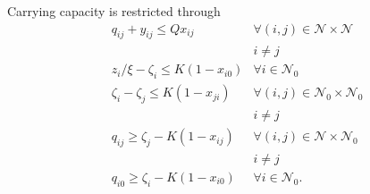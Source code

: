 \documentclass[journal]{IEEEtran}
\begin{document}
Carrying capacity is restricted through
\begin{subequations}
\label{eq:capacity-constraints}
\begin{align}
& {\ensuremath{q_{{i} {j}}}} + {\ensuremath{{\ensuremath{y}}_{{i} {j}}}} \leq {\ensuremath{Q}} {\ensuremath{x_{{i} {j}}}} & {\ensuremath{\forall({i},{j}) \in {\ensuremath{\mathcal{N}}} \times {\ensuremath{\mathcal{N}}}}} \label{eq:constrain-capacity} \\
& & i \neq j \nonumber \\
& {\ensuremath{z_{{i}}}}/{\ensuremath{\xi}} - {\ensuremath{\zeta_{{i}}}} \leq {\ensuremath{K}} \left( 1 - {\ensuremath{x_{{i} {0}}}} \right) & {\ensuremath{\forall {i} \in {\ensuremath{{\ensuremath{\mathcal{N}}}_{0}}}}} \label{eq:set-location-energy-to-route-energy} \\
& {\ensuremath{\zeta_{{i}}}} - {\ensuremath{\zeta_{{j}}}} \leq {\ensuremath{K}} \left( 1 - {\ensuremath{x_{{j} {i}}}} \right) & {\ensuremath{\forall({i},{j}) \in {\ensuremath{{\ensuremath{\mathcal{N}}}_{0}}} \times {\ensuremath{{\ensuremath{\mathcal{N}}}_{0}}}}} \label{eq:battery-capacity-at-location} \\
& & i \neq j \nonumber \\
& {\ensuremath{q_{{i} {j}}}} \geq {\ensuremath{\zeta_{{j}}}} - {\ensuremath{K}} \left( 1 - {\ensuremath{x_{{i} {j}}}} \right) & {\ensuremath{\forall({i},{j}) \in {\ensuremath{\mathcal{N}}} \times {\ensuremath{{\ensuremath{\mathcal{N}}}_{0}}}}} \label{eq:battery-weight-on-path} \\
& & i \neq j \nonumber \\
& {\ensuremath{q_{{i} {0}}}} \geq {\ensuremath{\zeta_{{i}}}} - {\ensuremath{K}} \left( 1 - {\ensuremath{x_{{i} {0}}}} \right) & {\ensuremath{\forall {i} \in {\ensuremath{{\ensuremath{\mathcal{N}}}_{0}}}}}. \label{eq:battery-weight-on-path-2}
\end{align} 
\end{subequations}
\end{document}

